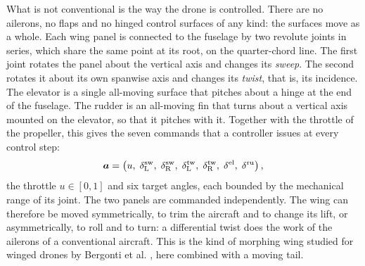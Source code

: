 What is not conventional is the way the drone is controlled. There are no ailerons, no flaps and no hinged control surfaces of any kind: the surfaces move as a whole. Each wing panel is connected to the fuselage by two revolute joints in series, which share the same point at its root, on the quarter-chord line. The first joint rotates the panel about the vertical axis and changes its \emph{sweep}. The second rotates it about its own spanwise axis and changes its \emph{twist}, that is, its incidence. The elevator is a single all-moving surface that pitches about a hinge at the end of the fuselage. The rudder is an all-moving fin that turns about a vertical axis mounted on the elevator, so that it pitches with it. Together with the throttle of the propeller, this gives the seven commands that a controller issues at every control step:
\begin{equation}
\bm{a} = \left( u,\; \delta^{\mathrm{sw}}_{\mathrm{L}},\; \delta^{\mathrm{sw}}_{\mathrm{R}},\; \delta^{\mathrm{tw}}_{\mathrm{L}},\; \delta^{\mathrm{tw}}_{\mathrm{R}},\; \delta^{\mathrm{el}},\; \delta^{\mathrm{ru}} \right),
\label{eq:drone-actions}
\end{equation}
the throttle $u \in [0,1]$ and six target angles, each bounded by the mechanical range of its joint. The two panels are commanded independently. The wing can therefore be moved symmetrically, to trim the aircraft and to change its lift, or asymmetrically, to roll and to turn: a differential twist does the work of the ailerons of a conventional aircraft. This is the kind of morphing wing studied for winged drones by Bergonti et al. \cite{bergonti2024codesign}, here combined with a moving tail.

